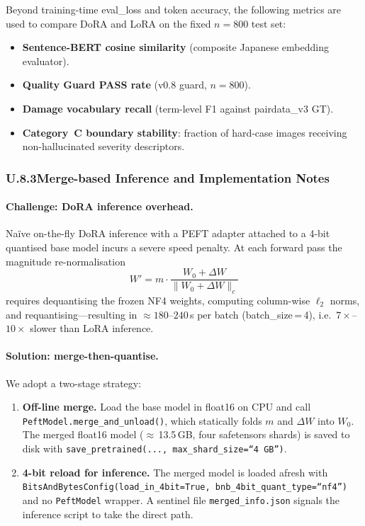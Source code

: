 \documentclass[onecolumn]{article}
\begin{document}
Beyond training-time eval\_loss and token accuracy, the following metrics
are used to compare DoRA and LoRA on the fixed $n{=}800$ test set:

\begin{itemize}
  \item \textbf{Sentence-BERT cosine similarity}
        (composite Japanese embedding evaluator).
  \item \textbf{Quality Guard PASS rate} (v0.8 guard, $n{=}800$).
  \item \textbf{Damage vocabulary recall} (term-level F1 against pairdata\_v3 GT).
  \item \textbf{Category~C boundary stability}: fraction of hard-case images
        receiving non-hallucinated severity descriptors.
\end{itemize}

\subsubsection*{U.8.3\enspace Merge-based Inference and Implementation Notes}

\paragraph{Challenge: DoRA inference overhead.}
Na\"ive on-the-fly DoRA inference with a PEFT adapter attached to a
4-bit quantised base model incurs a severe speed penalty.
At each forward pass the magnitude re-normalisation
\[
  W' = m \cdot \frac{W_0 + \Delta W}{\|W_0 + \Delta W\|_c}
\]
requires dequantising the frozen NF4 weights, computing column-wise
$\ell_2$ norms, and requantising---resulting in $\approx 180$--$240$\,s
per batch (batch\_size\,=\,4), i.e.\ $7\times$--$10\times$ slower than
LoRA inference.

\paragraph{Solution: merge-then-quantise.}
We adopt a two-stage strategy:

\begin{enumerate}
  \item \textbf{Off-line merge.}
        Load the base model in float16 on CPU and call
        \texttt{PeftModel.merge\_and\_unload()}, which statically
        folds $m$ and $\Delta W$ into $W_0$.
        The merged float16 model ($\approx$\,13.5\,GB, four safetensors
        shards) is saved to disk with
        \texttt{save\_pretrained(..., max\_shard\_size=``4\,GB'')}.

  \item \textbf{4-bit reload for inference.}
        The merged model is loaded afresh with
        \texttt{BitsAndBytesConfig(load\_in\_4bit=True, bnb\_4bit\_quant\_type=``nf4'')}
        and no \texttt{PeftModel} wrapper.
        A sentinel file \texttt{merged\_info.json} signals the inference
        script to take the direct path.
\end{enumerate}
\end{document}
